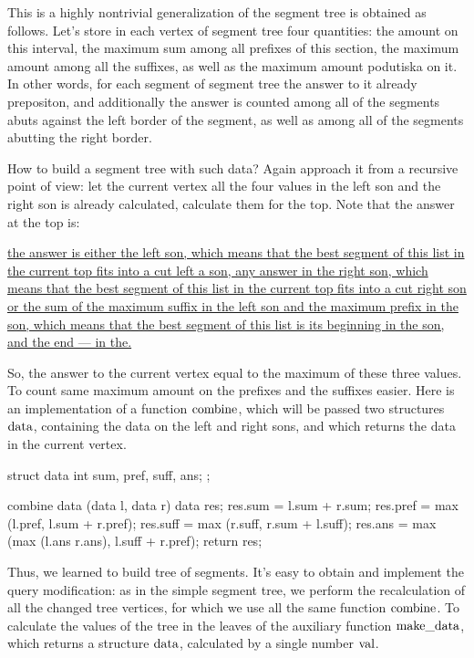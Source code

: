 This is a highly nontrivial generalization of the segment tree is obtained as follows. Let's store in each vertex of segment tree four quantities: the amount on this interval, the maximum sum among all prefixes of this section, the maximum amount among all the suffixes, as well as the maximum amount podutiska on it. In other words, for each segment of segment tree the answer to it already prepositon, and additionally the answer is counted among all of the segments abuts against the left border of the segment, as well as among all of the segments abutting the right border.

How to build a segment tree with such data? Again approach it from a recursive point of view: let the current vertex all the four values in the left son and the right son is already calculated, calculate them for the top. Note that the answer at the top is:

\ul{
\li the answer is either the left son, which means that the best segment of this list in the current top fits into a cut left a son,
\li any answer in the right son, which means that the best segment of this list in the current top fits into a cut right son
\li or the sum of the maximum suffix in the left son and the maximum prefix in the son, which means that the best segment of this list is its beginning in the son, and the end --- in the.
}

So, the answer to the current vertex equal to the maximum of these three values. To count same maximum amount on the prefixes and the suffixes easier. Here is an implementation of a function $\rm combine$, which will be passed two structures $\rm data$, containing the data on the left and right sons, and which returns the data in the current vertex.

\code
struct data {
int sum, pref, suff, ans;
};

combine data (data l, data r) {
data res;
res.sum = l.sum + r.sum;
res.pref = max (l.pref, l.sum + r.pref);
res.suff = max (r.suff, r.sum + l.suff);
res.ans = max (max (l.ans r.ans), l.suff + r.pref);
return res;
}
\endcode

Thus, we learned to build tree of segments. It's easy to obtain and implement the query modification: as in the simple segment tree, we perform the recalculation of all the changed tree vertices, for which we use all the same function $\rm combine$. To calculate the values of the tree in the leaves of the auxiliary function $\rm make\_data$, which returns a structure $\rm data$, calculated by a single number $\rm val$.

